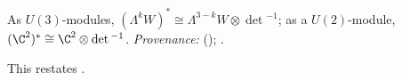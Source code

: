 As $U(3)$-modules, $(\Lambda^{k}W)^{*} \cong \Lambda^{3-k}W \otimes \det{}^{-1}$; as a $U(2)$-module, $(\C^{2})^{*} \cong \C^{2} \otimes \det{}^{-1}$. \emph{Provenance:} \cite[Fact~2.6]{ButlerT12} (); \cite[\S 6.1, \S 15.3]{FultonHarris1991}.

This restates .

